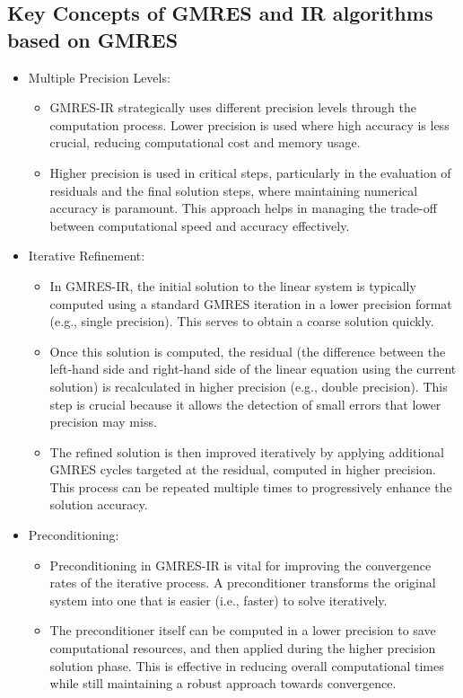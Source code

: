 \subsection{Key Concepts of GMRES and IR algorithms based on GMRES}
\begin{itemize}
    \item Multiple Precision Levels:
    \begin{itemize}
        \item GMRES-IR strategically uses different precision levels through the computation process. Lower precision is used where high accuracy is less crucial, reducing computational cost and memory usage.
        \item Higher precision is used in critical steps, particularly in the evaluation of residuals and the final solution steps, where maintaining numerical accuracy is paramount. This approach helps in managing the trade-off between computational speed and accuracy effectively.
    \end{itemize}
    \item Iterative Refinement: 
    \begin{itemize}
        \item In GMRES-IR, the initial solution to the linear system is typically computed using a standard GMRES iteration in a lower precision format (e.g., single precision). This serves to obtain a coarse solution quickly.
        \item Once this solution is computed, the residual (the difference between the left-hand side and right-hand side of the linear equation using the current solution) is recalculated in higher precision (e.g., double precision). This step is crucial because it allows the detection of small errors that lower precision may miss.
        \item The refined solution is then improved iteratively by applying additional GMRES cycles targeted at the residual, computed in higher precision. This process can be repeated multiple times to progressively enhance the solution accuracy.
    \end{itemize}
    \item Preconditioning: 
    \begin{itemize}
        \item Preconditioning in GMRES-IR is vital for improving the convergence rates of the iterative process. A preconditioner transforms the original system into one that is easier (i.e., faster) to solve iteratively.
        \item The preconditioner itself can be computed in a lower precision to save computational resources, and then applied during the higher precision solution phase. This is effective in reducing overall computational times while still maintaining a robust approach towards convergence.

\end{itemize}
\end{itemize}
